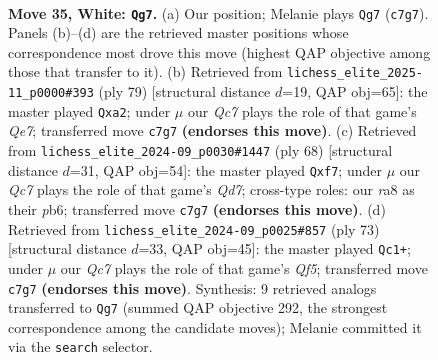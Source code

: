 \documentclass[11pt]{article}
\begin{document}
\clearpage

\begin{figure}[p]\centering
\begin{subfigure}{0.46\textwidth}\centering
\resizebox{\linewidth}{!}{%
\newchessgame
\chessboard[
  setfen={r7/2Q4p/3pkp2/8/pP6/6P1/P4PKP/1q6 w - - 5 35},
  showmover=false,
  pgfstyle=straightmove, color=movearrow, markmove={c7-g7}
]}
\caption{}
\end{subfigure}\hfill
\begin{subfigure}{0.46\textwidth}\centering
\resizebox{\linewidth}{!}{%
\newchessgame
\chessboard[
  setfen={8/2p3pk/7p/1pQ2p2/8/7P/P3qPPK/8 b - - 1 40},
  showmover=false,
  pgfstyle=straightmove, color=movearrow, markmove={e2-a2}
]}
\caption{}
\end{subfigure}
\\[4pt]
\begin{subfigure}{0.46\textwidth}\centering
\resizebox{\linewidth}{!}{%
\newchessgame
\chessboard[
  setfen={8/2pQ1ppk/1p5p/8/4P3/1Pq3P1/5PP1/6K1 w - - 0 35},
  showmover=false,
  pgfstyle=straightmove, color=movearrow, markmove={d7-f7}
]}
\caption{}
\end{subfigure}\hfill
\begin{subfigure}{0.46\textwidth}\centering
\resizebox{\linewidth}{!}{%
\newchessgame
\chessboard[
  setfen={8/5pk1/6p1/pp1Q3p/5q2/7P/PP3PP1/5K2 b - - 0 37},
  showmover=false,
  pgfstyle=straightmove, color=movearrow, markmove={f4-c1}
]}
\caption{}
\end{subfigure}
\caption{\textbf{Move 35, White: \texttt{Qg7}.} (a) Our position; Melanie plays \texttt{Qg7} (\texttt{c7g7}). Panels (b)--(d) are the retrieved master positions whose correspondence most drove this move (highest QAP objective among those that transfer to it). (b) Retrieved from \texttt{lichess\_elite\_2025-11\_p0000\#393} (ply 79) [structural distance $d$=19, QAP obj=65]: the master played \texttt{Qxa2}; under $\mu$ our \emph{Qc7} plays the role of that game's \emph{Qe7}; transferred move \texttt{c7g7} \textbf{(endorses this move)}. (c) Retrieved from \texttt{lichess\_elite\_2024-09\_p0030\#1447} (ply 68) [structural distance $d$=31, QAP obj=54]: the master played \texttt{Qxf7}; under $\mu$ our \emph{Qc7} plays the role of that game's \emph{Qd7}; cross-type roles: our \emph{r}a8 as their \emph{p}b6; transferred move \texttt{c7g7} \textbf{(endorses this move)}. (d) Retrieved from \texttt{lichess\_elite\_2024-09\_p0025\#857} (ply 73) [structural distance $d$=33, QAP obj=45]: the master played \texttt{Qc1+}; under $\mu$ our \emph{Qc7} plays the role of that game's \emph{Qf5}; transferred move \texttt{c7g7} \textbf{(endorses this move)}. Synthesis: 9 retrieved analogs transferred to \texttt{Qg7} (summed QAP objective 292, the strongest correspondence among the candidate moves); Melanie committed it via the \texttt{search} selector.}
\label{fig:thought-m68}
\end{figure}
\end{document}
